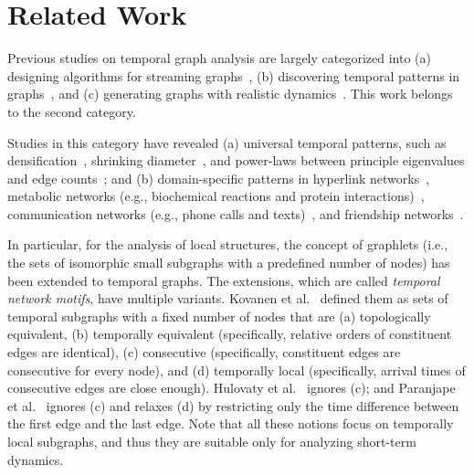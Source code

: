 

\section{Related Work}\label{section:relwork}

Previous studies on temporal graph analysis are largely categorized into (a) designing algorithms for streaming graphs~\cite{lee2020temporal, eswaran2018spotlight, liben2007link, mcgregor2014graph}, (b) discovering temporal patterns in graphs~\cite{leskovec2005graphs, akoglu2008rtm, beyer2010mechanistic, akoglu2010structure, bahulkar2016analysis}, and (c) generating graphs with realistic dynamics~\cite{barabasi1999emergence, leskovec2010kronecker, akoglu2008rtm}. This work belongs to the second category.

Studies in this category have revealed (a) universal temporal patterns, such as densification~\cite{leskovec2005graphs}, shrinking diameter~\cite{leskovec2005graphs}, and power-laws between principle eigenvalues and edge counts~\cite{akoglu2008rtm}; and (b) domain-specific patterns in hyperlink networks~\cite{broder2011graph}, metabolic networks (e.g., biochemical reactions and  protein interactions)~\cite{beyer2010mechanistic}, communication networks (e.g., phone calls and
texts)~\cite{hidalgo2008dynamics,akoglu2010structure}, and friendship networks~\cite{bahulkar2016analysis}.

In particular, for the analysis of local structures, the concept of graphlets \cite{prvzulj2007biological} (i.e., the sets of isomorphic small subgraphs with a predefined number of nodes) has been extended to temporal graphs. The extensions, which are called \textit{temporal network motifs}, have multiple variants.
Kovanen et al.~\cite{kovanen2011temporal}  defined them as sets of temporal subgraphs with a fixed number of nodes that are (a) topologically equivalent, (b) temporally equivalent (specifically, relative orders of constituent edges are identical), (c)  consecutive (specifically, constituent edges are consecutive for every node), and (d) temporally local (specifically, arrival times of consecutive edges are close enough).
Hulovaty et al.~\cite{hulovatyy2015exploring} ignores (c); and Paranjape et al.~\cite{paranjape2017motifs} 
ignores (c) and relaxes (d) by restricting only the time difference between the first edge and the last edge.
Note that all these notions focus on temporally local subgraphs, and thus they are suitable only for analyzing short-term dynamics. 

